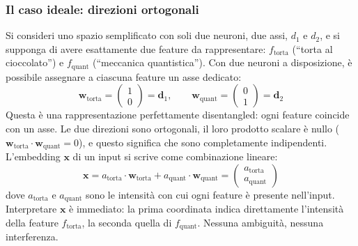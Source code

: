 \subsubsection{Il caso ideale: direzioni ortogonali}
Si consideri uno spazio semplificato con soli due neuroni, due assi, $d_1$ e $d_2$, e si supponga di avere esattamente due feature da rappresentare: $f_{\text{torta}}$ (``torta al cioccolato'') e $f_{\text{quant}}$ (``meccanica quantistica''). Con due neuroni a disposizione, è possibile assegnare a ciascuna feature un asse dedicato:
\begin{equation}
    \mathbf{w}_{\text{torta}} = \begin{pmatrix} 1 \\ 0 \end{pmatrix} = \mathbf{d}_1, \qquad
    \mathbf{w}_{\text{quant}} = \begin{pmatrix} 0 \\ 1 \end{pmatrix} = \mathbf{d}_2
\end{equation}
Questa è una rappresentazione perfettamente disentangled: ogni feature coincide con un asse. Le due direzioni sono ortogonali, il loro prodotto scalare è nullo ($\mathbf{w}_{\text{torta}} \cdot \mathbf{w}_{\text{quant}} = 0$), e questo significa che sono completamente indipendenti.
L'embedding $\mathbf{x}$ di un input si scrive come combinazione lineare:
\begin{equation}
    \mathbf{x} = a_{\text{torta}} \cdot \mathbf{w}_{\text{torta}} + a_{\text{quant}} \cdot \mathbf{w}_{\text{quant}} = \begin{pmatrix} a_{\text{torta}} \\ a_{\text{quant}} \end{pmatrix}
\end{equation}
dove $a_{\text{torta}}$ e $a_{\text{quant}}$ sono le intensità con cui ogni feature è presente nell'input.
Interpretare $\mathbf{x}$ è immediato: la prima coordinata indica direttamente l'intensità della feature $f_{\text{torta}}$, la seconda quella di $f_{\text{quant}}$. Nessuna ambiguità, nessuna interferenza.

